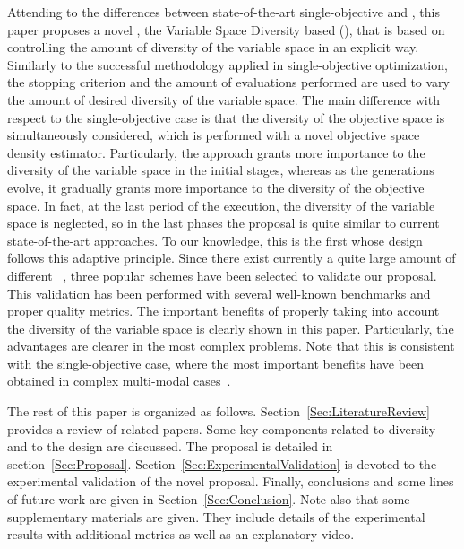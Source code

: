 Attending to the differences between state-of-the-art single-objective \EAS{} and \MOEAS{}, 
this paper proposes a novel \MOEA{}, the Variable Space Diversity based \MOEA{} (\VSDMOEA{}), 
that is based on controlling the amount of diversity of the variable space in an explicit way.
%
Similarly to the successful methodology applied in single-objective optimization, the stopping criterion and the 
amount of evaluations performed are used to vary the amount of desired diversity of the variable space.
%
The main difference with respect to the single-objective case is that the diversity of the objective space is simultaneously considered, 
which is performed with a novel objective space density estimator.
%
Particularly, the approach grants more importance to the diversity of the variable space in the initial stages, whereas 
as the generations evolve, it gradually grants more importance to the diversity of the objective space.
%
In fact, at the last period of the execution, the diversity of the variable space is neglected, so in the last phases the proposal 
is quite similar to current state-of-the-art approaches.
%
To our knowledge, this is the first \MOEA{} whose design follows this adaptive principle.
%
Since there exist currently a quite large amount of different \MOEAS{}~\cite{Joel:MOEA_APPLICATIONS_BOOK_KCTAN}, 
three popular schemes have been selected to validate our proposal.
%
%
%
%
%
This validation has been performed with several well-known benchmarks and proper quality metrics.
%
The important benefits of properly taking into account the diversity of the variable space is
clearly shown in this paper.
%
Particularly, the advantages are clearer in the most complex problems.
%
Note that this is consistent with the single-objective case, where the most important benefits have been obtained
in complex multi-modal cases~\cite{Segura:17}.

The rest of this paper is organized as follows. 
%
Section~\ref{Sec:LiteratureReview} provides a review of related papers.
%
Some key components related to diversity and to the \VSDMOEA{} design are discussed.
%
The \VSDMOEA{} proposal is detailed in section~\ref{Sec:Proposal}.
%
Section~\ref{Sec:ExperimentalValidation} is devoted to the experimental validation of the novel proposal.
%
Finally, conclusions and some lines of future work are given in Section~\ref{Sec:Conclusion}.
%
Note also that some supplementary materials are given.
%
They include details of the experimental results with additional metrics as well as an explanatory video.
